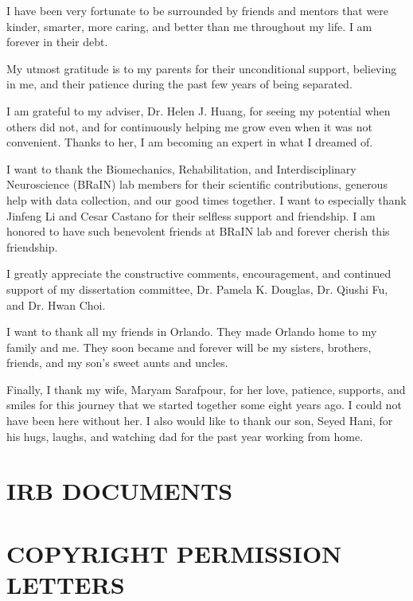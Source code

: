 \documentclass{UCF_ETD}
\begin{document}
\begin{acknowledgments}
I have been very fortunate to be surrounded by friends and mentors that were kinder, smarter, more caring, and better than me throughout my life. I am forever in their debt.

My utmost gratitude is to my parents for their unconditional support, believing in me, and their patience during the past few years of being separated.

I am grateful to my adviser, Dr. Helen J. Huang, for seeing my potential when others did not, and for continuously helping me grow even when it was not convenient. Thanks to her, I am becoming an expert in what I dreamed of.

I want to thank the Biomechanics, Rehabilitation, and Interdisciplinary Neuroscience (BRaIN) lab members for their scientific contributions, generous help with data collection, and our good times together. I want to especially thank Jinfeng Li and Cesar Castano for their selfless support and friendship. I am honored to have such benevolent friends at BRaIN lab and forever cherish this friendship.

I greatly appreciate the constructive comments, encouragement, and continued support of my dissertation committee, Dr. Pamela K. Douglas, Dr. Qiushi Fu, and Dr. Hwan Choi.

I want to thank all my friends in Orlando. They made Orlando home to my family and me. They soon became and forever will be my sisters, brothers, friends, and my son's sweet aunts and uncles.

Finally, I thank my wife, Maryam Sarafpour, for her love, patience, supports, and smiles for this journey that we started together some eight years ago. I could not have been here without her. I also would like to thank our son, Seyed Hani, for his hugs, laughs, and watching dad for the past year working from home.
\end{acknowledgments}

\tableofcontents

\listoffigures

\listoftables

\mainmatter





\appendix

\chapter{IRB DOCUMENTS}
\newpage



\chapter{COPYRIGHT PERMISSION LETTERS}
\newpage


\backmatter
\end{document}

